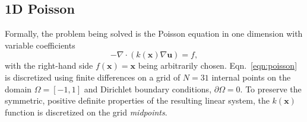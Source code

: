 \documentclass[review]{siamart190516}
\renewcommand{\vec}[1]{\bm{{#1}}}
\newcommand{\grad}{\nabla}
\begin{document}
\subsection{1D Poisson}\label{subsec:methods_poisson}

Formally, the problem being solved is the Poisson equation in one dimension with variable coefficients
%
\begin{equation} \label{eqn:poisson}
  -\grad \cdot \left(k\left(\vec{x}\right) \grad\vec{u}\right) = f,
\end{equation}
%
with the right-hand side $f\left(\vec{x}\right)=\vec{x}$ being arbitrarily chosen.  Eqn.~\eqref{eqn:poisson} is discretized using finite differences on a grid of $N=31$ internal points on the domain $\Omega = \left[-1, 1\right]$ and Dirichlet boundary conditions, $\partial\Omega = 0$.  To preserve the symmetric, positive definite properties of the resulting linear system, the $k\left(\vec{x}\right)$ function is discretized on the grid \textit{midpoints}\cite{numpde}.
\end{document}
